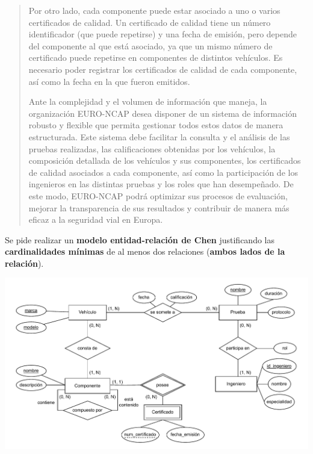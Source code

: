 \documentclass[
    12pt,
    a4paper,
    addpoints,
    answers,
    convocatoria=ext,
    titulacion=NoCD,
    curso=2024/2025,
]{db-exam}
\begin{document}
\begin{questions}
\begin{quotation}
Por otro lado, cada componente puede estar asociado a uno o varios certificados de calidad. Un certificado de calidad tiene un número identificador (que puede repetirse) y una fecha de emisión, pero depende del componente al que está asociado, ya que un mismo número de certificado puede repetirse en componentes de distintos vehículos. Es necesario poder registrar los certificados de calidad de cada componente, así como la fecha en la que fueron emitidos.

Ante la complejidad y el volumen de información que maneja, la organización EURO-NCAP desea disponer de un sistema de información robusto y flexible que permita gestionar todos estos datos de manera estructurada. Este sistema debe facilitar la consulta y el análisis de las pruebas realizadas, las calificaciones obtenidas por los vehículos, la composición detallada de los vehículos y sus componentes, los certificados de calidad asociados a cada componente, así como la participación de los ingenieros en las distintas pruebas y los roles que han desempeñado. De este modo, EURO-NCAP podrá optimizar sus procesos de evaluación, mejorar la transparencia de sus resultados y contribuir de manera más eficaz a la seguridad vial en Europa.
\end{quotation}

Se pide realizar un \textbf{modelo entidad-relación de Chen} justificando las  \textbf{cardinalidades mínimas} de al menos dos relaciones (\textbf{ambos lados de la relación}).

\begin{solution}[50em]
\includegraphics[width=\textwidth]{figs/bbdd-2024-2025-extraordinaria/mer25ex.pdf}


\end{solution}
\end{questions}
\end{document}
